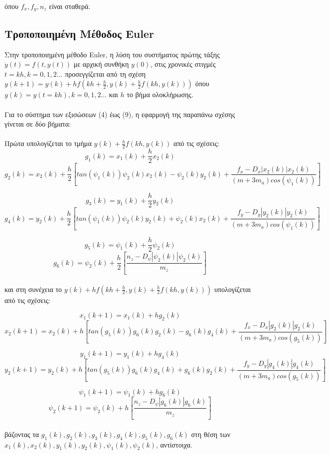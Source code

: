 \documentclass{article}
\begin{document}
όπου \(f_x, f_y, n_z\) είναι σταθερά.

\subsection{Τροποποιημένη Μέθοδος Euler}
Στην τροποποιημένη μέθοδο Euler, η λύση του συστήματος πρώτης τάξης \(\dot{y}(t) = f(t, y(t))\) με αρχική συνθήκη \(y(0)\), στις χρονικές στιγμές \(t = kh, k = 0, 1, 2...\) προσεγγίζεται από τη σχέση \(y(k+1) = y(k) + hf(kh + \frac{h}{2}, y(k) + \frac{h}{2}f(kh, y(k)))\) όπου \(y(k) = y(t = kh), k = 0, 1, 2...\) και \(h\) το βήμα ολοκλήρωσης.
\\\\
Για το σύστημα των εξισώσεων (4) έως (9), η εφαρμογή της παραπάνω σχέσης γίνεται σε δύο βήματα:
\\\\
Πρώτα υπολογίζεται το τμήμα \(y(k) + \frac{h}{2}f(kh, y(k))\) από τις σχέσεις: 
\[g_1(k) = x_1(k) + \frac{h}{2}x_2(k)\]
\[g_2(k) = x_2(k) + \frac{h}{2}[tan(\psi_1(k))\psi_2(k)x_2(k) - \psi_2(k)y_2(k) + \frac{f_x - D_x|x_2(k)|x_2(k)}{(m + 3m_a)cos(\psi_1(k))}]\]

\[ g_3(k)   = y_1(k) + \frac{h}{2}y_2(k)   \]
\[g_4(k) = y_2(k) + \frac{h}{2}[tan(\psi_1(k))\psi_2(k)y_2(k) + \psi_2(k)x_2(k) + \frac{f_y - D_y|y_2(k)|y_2(k)}{(m + 3m_a)cos(\psi_1(k))}]\]


\[ g_5(k)   = \psi_1(k) + \frac{h}{2}\psi_2(k)   \]
\[ g_6(k) = \psi_2(k) + \frac{h}{2}[\frac{n_z - D_\psi|\psi_2(k)|\psi_2(k)}{m_z}]\]
\\
και στη συνέχεια το \(y(k) + hf(kh + \frac{h}{2}, y(k) + \frac{h}{2}f(kh, y(k)))\) υπολογίζεται από τις σχέσεις:

\[x_1(k+1) = x_1(k) + hg_2(k)\]
\[x_2(k+1) = x_2(k) + h[tan(g_5(k))g_6(k)g_2(k) - g_6(k)g_4(k) + \frac{f_x - D_x|g_2(k)|g_2(k)}{(m + 3m_a)cos(g_5(k))}]\]

\[ y_1(k+1)   = y_1(k) + hg_4(k)   \]
\[y_2(k+1) = y_2(k) + h[tan(g_5(k))g_6(k)g_4(k) + g_6(k)g_2(k) + \frac{f_y - D_y|g_4(k)|g_4(k)}{(m + 3m_a)cos(g_5(k))}]\]


\[ \psi_1(k+1)   = \psi_1(k) + hg_6(k)   \]
\[ \psi_2(k+1) = \psi_2(k) + h[\frac{n_z - D_\psi|g_6(k)|g_6(k)}{m_z}]\]
\\
βάζοντας τα \(g_1(k), g_2(k), g_3(k), g_4(k), g_5(k), g_6(k)\) στη θέση των \(x_1(k), x_2(k), y_1(k), y_2(k), \psi_1(k), \psi_2(k)\), αντίστοιχα.
\end{document}
